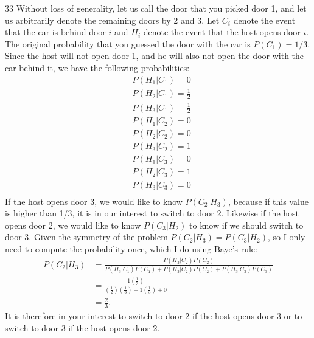 \begin{problem} {33}
Without loss of generality, let us call the door that you picked door 1, and let us arbitrarily denote the remaining doors by 2 and 3.  Let $C_i$ denote the event that the car is behind door $i$ and $H_i$ denote the event that the host opens door $i$.  The original probability that you guessed the door with the car is $P(C_1) = 1/3$.  Since the host will not open door 1, and he will also not open the door with the car behind it, we have the following probabilities:
\begin{align*}
&P(H_1|C_1)= 0 \\
&P(H_2|C_1)=\frac{1}{2} \\
&P(H_3|C_1)=\frac{1}{2} \\
&P(H_1|C_2) = 0 \\
&P(H_2|C_2) = 0 \\
&P(H_3|C_2) = 1 \\
&P(H_1|C_3) = 0 \\
&P(H_2|C_3) = 1 \\
&P(H_3|C_3) = 0 \\
\end{align*}
If the host opens door 3, we would like to know $P(C_2|H_3)$, because if this value is higher than 1/3, it is in our interest to switch to door 2.  Likewise if the host opens door 2, we would like to know $P(C_3|H_2)$ to know if we should switch to door 3.  Given the symmetry of the problem $P(C_2|H_3)=P(C_3|H_2)$, so I only need to compute the probability once, which I do using Baye's rule:
\begin{align*}
P(C_2|H_3) &= \frac{P(H_3|C_2)P(C_2)}{P(H_3|C_1)P(C_1)+P(H_3|C_2)P(C_2)+P(H_3|C_3)P(C_3)} \\
& = \frac{1\left(\frac{1}{3}\right)}{\left(\frac{1}{2}\right)\left(\frac{1}{3}\right)+1\left(\frac{1}{3}\right)+0} \\
& = \frac{2}{3}.
\end{align*}
It is therefore in your interest to switch to door 2 if the host opens door 3 or to switch to door 3 if the host opens door 2.





\end{problem}


